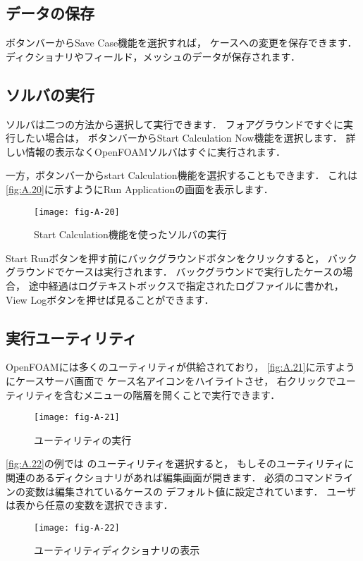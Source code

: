 \subsection{データの保存}
\label{ssec:A.4.6}
ボタンバーからSave Case機能を選択すれば，
ケースへの変更を保存できます．
ディクショナリやフィールド，メッシュのデータが保存されます．


\subsection{ソルバの実行}
\label{ssec:A.4.7}
ソルバは二つの方法から選択して実行できます．
フォアグラウンドですぐに実行したい場合は，
ボタンバーからStart Calculation Now機能を選択します．
詳しい情報の表示なくOpenFOAMソルバはすぐに実行されます．

一方，ボタンバーからstart Calculation機能を選択することもできます．
これは\autoref{fig:A.20}に示すようにRun Applicationの画面を表示します．


\begin{figure}[ht]
 \texttt{[image: fig-A-20]}
 \caption{Start Calculation機能を使ったソルバの実行}
 \label{fig:A.20}
\end{figure}


Start Runボタンを押す前にバックグラウンドボタンをクリックすると，
バックグラウンドでケースは実行されます．
バックグラウンドで実行したケースの場合，
途中経過はログテキストボックスで指定されたログファイルに書かれ，
View Logボタンを押せば見ることができます．


\subsection{実行ユーティリティ}
\label{ssec:A.4.8}
OpenFOAMには多くのユーティリティが供給されており，
\autoref{fig:A.21}に示すようにケースサーバ画面で
ケース名アイコンをハイライトさせ，
右クリックでユーティリティを含むメニューの階層を開くことで実行できます．


\begin{figure}[ht]
 \texttt{[image: fig-A-21]}
 \caption{ユーティリティの実行}
 \label{fig:A.21}
\end{figure}


\autoref{fig:A.22}の例では
のユーティリティを選択すると，
もしそのユーティリティに関連のあるディクショナリがあれば編集画面が開きます．
必須のコマンドラインの変数は編集されているケースの
デフォルト値に設定されています．
ユーザは表から任意の変数を選択できます．


\begin{figure}[ht]
 \texttt{[image: fig-A-22]}
 \caption{ユーティリティディクショナリの表示}
 \label{fig:A.22}
\end{figure}


